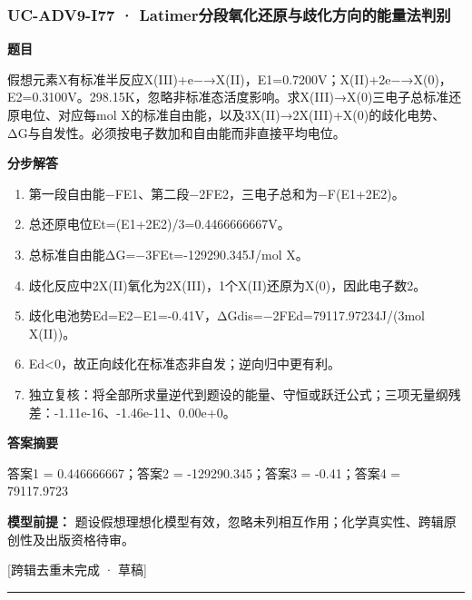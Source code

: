 \documentclass[UTF8,11pt,a4paper]{ctexart}
\begin{document}
\subsubsection*{UC-ADV9-I77 · Latimer分段氧化还原与歧化方向的能量法判别}
\noindent\textbf{题目}\par
假想元素X有标准半反应X(III)+e−→X(II)，E1=0.7200V；X(II)+2e−→X(0)，E2=0.3100V。298.15K，忽略非标准态活度影响。求X(III)→X(0)三电子总标准还原电位、对应每mol X的标准自由能，以及3X(II)→2X(III)+X(0)的歧化电势、ΔG与自发性。必须按电子数加和自由能而非直接平均电位。\par
\medskip\noindent\textbf{分步解答}
\begin{enumerate}
\item 第一段自由能−FE1、第二段−2FE2，三电子总和为−F(E1+2E2)。
\item 总还原电位Et=(E1+2E2)/3=0.4466666667V。
\item 总标准自由能ΔG=−3FEt=-129290.345J/mol X。
\item 歧化反应中2X(II)氧化为2X(III)，1个X(II)还原为X(0)，因此电子数2。
\item 歧化电池势Ed=E2−E1=-0.41V，ΔGdis=−2FEd=79117.97234J/(3mol X(II))。
\item Ed<0，故正向歧化在标准态非自发；逆向归中更有利。
\item 独立复核：将全部所求量逆代到题设的能量、守恒或跃迁公式；三项无量纲残差：-1.11e-16、-1.46e-11、0.00e+0。
\end{enumerate}
\noindent\textbf{答案摘要}\par
答案1 = 0.446666667；答案2 = -129290.345；答案3 = -0.41；答案4 = 79117.9723\par
\noindent\textbf{模型前提：}
题设假想理想化模型有效，忽略未列相互作用；化学真实性、跨辑原创性及出版资格待审。\par
\noindent\textcolor{red!65!black}{[跨辑去重未完成 · 草稿]} \par
\medskip\hrule\medskip
{}
\end{document}
